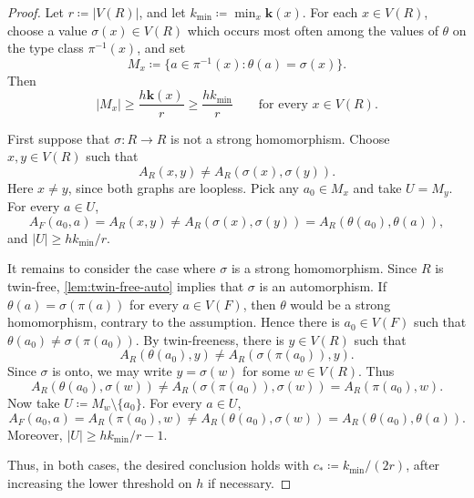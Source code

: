 \documentclass[10pt,a4paper]{amsart}
\begin{document}
\begin{proof}
Let $r\coloneqq |V(R)|$, and let $k_{\min}\coloneqq\min_x\mathbf k(x)$. For each $x\in V(R)$, choose a value $\sigma(x)\in V(R)$ which occurs most often among the values of $\theta$ on the type class $\pi^{-1}(x)$, and set
\[
        M_x\coloneqq\{a\in\pi^{-1}(x):\theta(a)=\sigma(x)\}.
\]
Then
\[
        |M_x|\ge \frac{h\mathbf k(x)}{r}\ge \frac{hk_{\min}}{r}
        \qquad\text{for every }x\in V(R).
\]

First suppose that $\sigma:R\to R$ is not a strong homomorphism. Choose $x,y\in V(R)$ such that
\[
        A_R(x,y)\ne A_R(\sigma(x),\sigma(y)).
\]
Here $x\ne y$, since both graphs are loopless. Pick any $a_0\in M_x$ and take $U=M_y$. For every $a\in U$,
\[
        A_F(a_0,a)=A_R(x,y)
        \ne A_R(\sigma(x),\sigma(y))
        =A_R(\theta(a_0),\theta(a)),
\]
and $|U|\ge hk_{\min}/r$.

It remains to consider the case where $\sigma$ is a strong homomorphism. Since $R$ is twin-free, \cref{lem:twin-free-auto} implies that $\sigma$ is an automorphism. If $\theta(a)=\sigma(\pi(a))$ for every $a\in V(F)$, then $\theta$ would be a strong homomorphism, contrary to the assumption. Hence there is $a_0\in V(F)$ such that $\theta(a_0)\ne\sigma(\pi(a_0))$. By twin-freeness, there is $y\in V(R)$ such that
\[
        A_R(\theta(a_0),y)\ne A_R(\sigma(\pi(a_0)),y).
\]
Since $\sigma$ is onto, we may write $y=\sigma(w)$ for some $w\in V(R)$. Thus
\[
        A_R(\theta(a_0),\sigma(w))
        \ne A_R(\sigma(\pi(a_0)),\sigma(w))=A_R(\pi(a_0),w).
\]
Now take $U\coloneqq M_w\setminus\{a_0\}$. For every $a\in U$,
\[
        A_F(a_0,a)=A_R(\pi(a_0),w)
        \ne A_R(\theta(a_0),\sigma(w))
        =A_R(\theta(a_0),\theta(a)).
\]
Moreover, $|U|\ge hk_{\min}/r-1$.

Thus, in both cases, the desired conclusion holds with $c_*\coloneqq k_{\min}/(2r)$, after increasing the lower threshold on $h$ if necessary.
\end{proof}
\end{document}
